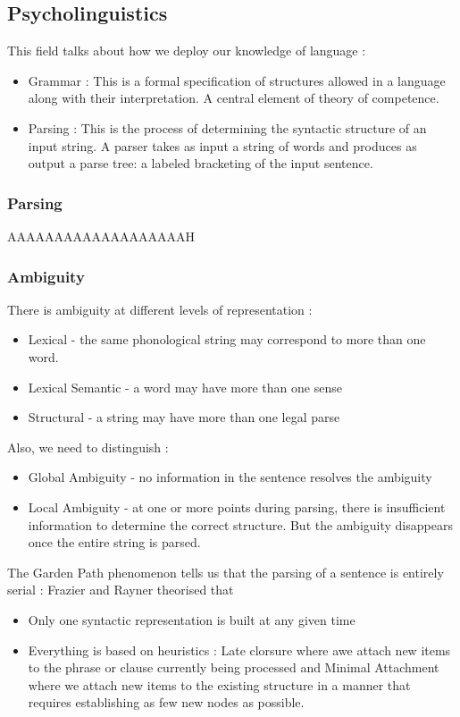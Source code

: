 \documentclass{cours}
\begin{document}
\subsection{Psycholinguistics}
This field talks about how we deploy our knowledge of language :
\begin{itemize}
    \item Grammar : This is a formal specification of structures allowed in a language along with their interpretation. A central element of theory of competence.
    \item Parsing : This is the process of determining the syntactic structure of an input string. A parser takes as input a string of words and produces as output a parse tree: a labeled bracketing of the input sentence.
\end{itemize}

\subsubsection{Parsing}
AAAAAAAAAAAAAAAAAAAH

\subsubsection{Ambiguity}
There is ambiguity at different levels of representation :
\begin{itemize}
    \item Lexical - the same phonological string may correspond to more than one word.
    \item Lexical Semantic - a word may have more than one sense
    \item Structural - a string may have more than one legal parse
\end{itemize}
Also, we need to distinguish :
\begin{itemize}
    \item Global Ambiguity - no information in the sentence resolves the ambiguity
    \item Local Ambiguity - at one or more points during parsing, there is insufficient information to determine the correct structure. But the ambiguity disappears once the entire string is parsed.
\end{itemize}
The Garden Path phenomenon tells us that the parsing of a sentence is entirely serial : Frazier and Rayner theorised that
\begin{itemize}
    \item Only one syntactic representation is built at any given time
    \item Everything is based on heuristics : Late clorsure where awe attach new items to the phrase or clause currently being processed and Minimal Attachment where we attach new items to the existing structure in a manner that requires establishing as few new nodes as possible.
\end{itemize}
\end{document}
